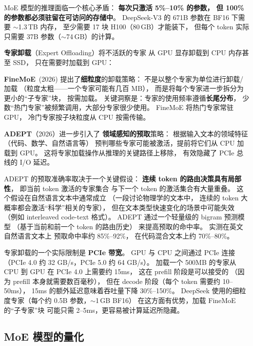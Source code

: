 MoE 模型的推理面临一个核心矛盾：
\textbf{每次只激活 5\%--10\% 的参数，
但 100\% 的参数都必须驻留在可访问的存储中}。
DeepSeek-V3 的 671B 参数在 BF16 下需要 $\sim$1.3\,TB 内存，
至少需要 17 块 H100（80\,GB）才能装下，
但每个 token 实际只需要 37B 参数（$\sim$74\,GB）的计算。

\textbf{专家卸载}（Expert Offloading）将不活跃的专家
从 GPU 显存卸载到 CPU 内存甚至 SSD，
只在需要时加载到 GPU：

\textbf{FineMoE}~(2026) 提出了\textbf{细粒度}的卸载策略：%
不是以整个专家为单位进行卸载/加载
（粒度太粗——一个专家可能有几百 MB），
而是将每个专家进一步拆分为更小的“子专家”块，
按需加载。
关键洞察是：专家的使用频率遵循\textbf{长尾分布}，
少数“热门专家”被频繁调用，大部分专家很少使用。
FineMoE 将热门专家常驻 GPU，
冷门专家按子块粒度从 CPU 按需传输。

\textbf{ADEPT}（2026）进一步引入了%
\textbf{领域感知的预取}策略：
根据输入文本的领域特征（代码、数学、自然语言等）
预判哪些专家可能被激活，提前将它们从 CPU 加载到 GPU。
这将专家加载操作从推理的关键路径上移除，
有效隐藏了 PCIe 总线的 I/O 延迟。

ADEPT 的预取准确率取决于一个关键假设：
\textbf{连续 token 的路由决策具有局部性}，
即当前 token 激活的专家集合
与下一个 token 的激活集合有大量重叠。
这个假设在自然语言文本中通常成立
（一段讨论物理学的文本中，
连续的 token 大概率都会激活“科学”相关的专家），
但在文本类型快速变化的场景中可能失效
（例如 interleaved code-text 格式）。
ADEPT 通过一个轻量级的 bigram 预测模型
（基于当前和前一个 token 的路由历史）
来提高预取的命中率。
实测在英文自然语言文本上
预取命中率约 85\%--92\%，
在代码混合文本上约 70\%--80\%。

专家卸载的一个实际限制是 \textbf{PCIe 带宽}。
GPU 与 CPU 之间通过 PCIe 连接
（PCIe 4.0 约 32 GB/s，PCIe 5.0 约 64 GB/s）。
加载一个 500MB 的专家从 CPU 到 GPU
在 PCIe 4.0 上需要约 15ms，
这在 prefill 阶段是可以接受的
（因为 prefill 本身就需要数百毫秒），
但在 decode 阶段（每个 token 需要约 10--50ms），
15ms 的额外延迟意味着吞吐量下降 30\%--150\%。
DeepSeek 使用的细粒度专家（每个约 0.5B 参数，$\sim$1\,GB BF16）
在这方面有优势，加载 FineMoE 的“子专家”块
可能只需 2--5ms，更容易被计算延迟所隐藏。

\subsection{MoE 模型的量化}

